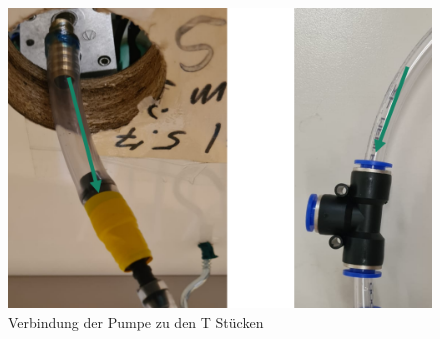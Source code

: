 \documentclass[10pt,a4paper]{report}
\begin{document}
	\begin{figure}[htb]
		\includegraphics[width=1\textwidth]{zu8.}
		\centering
		\caption{Verbindung der Pumpe zu den T Stücken}
	\end{figure}
	
	
\end{document}

